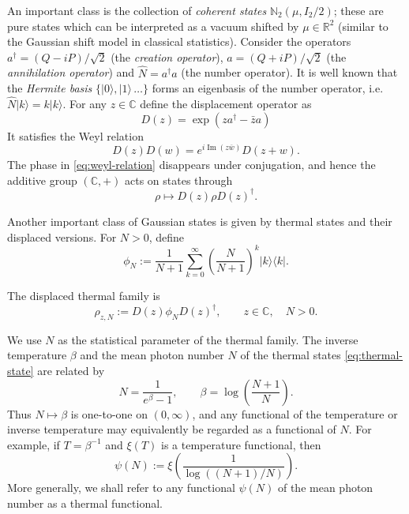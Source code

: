 \documentclass{article}
\theoremstyle{named}
\theoremstyle{named1}
\newcommand{\bbC}{\mathbb C}
\theoremstyle{plain}
\theoremstyle{remark}
\begin{document}
An important class
is the collection of \textit{coherent states} $\mathbb{N}_{2}\left(  \mu,I_2/2\right)  $;
these are pure states which can be interpreted as a vacuum shifted by $\mu
\in\mathbb{R}^{2}$ (similar to the Gaussian shift model in classical statistics).
Consider the operators $a^{\dagger}=(Q-iP)/\sqrt{2}$ (the \textit{creation operator}), $a=(Q+iP)/\sqrt{2}$ (the \textit{annihilation operator}) and $\hat N=a^{\dagger}a$ (the number operator). It is well known that the \textit{Hermite basis} $\{|0\rangle,|1\rangle\,\ldots\}$ forms an eigenbasis of the number operator,  i.e. $\hat N|k\rangle=k|k\rangle$. For any $z \in \mathbb{C}$ define the displacement operator as
$$D(z)=\exp(za^{\dagger}-\bar{z}a)$$ 
It satisfies the Weyl relation
\begin{equation}
    D(z)D(w)
    =
    e^{i\operatorname{Im}(z\overline w)}
    D(z+w).
    \label{eq:weyl-relation}
\end{equation}
The phase in \eqref{eq:weyl-relation} disappears under conjugation, and hence
the additive group
$(\bbC,+)$
acts on states through
\[
    \rho\longmapsto D(z)\rho D(z)^\dagger.
\]


Another important class of Gaussian states is given by thermal states and
their displaced versions. For $N>0$, define
\begin{equation}
    \phi_N
    :=
    \frac{1}{N+1}
    \sum_{k=0}^{\infty}
    \left(
        \frac{N}{N+1}
    \right)^k
    |k\rangle\langle k|.
    \label{eq:thermal-state}
\end{equation}


The displaced thermal family is
\begin{equation}
    \rho_{z,N}
    :=
    D(z)\phi_ND(z)^\dagger,
    \qquad
    z\in\bbC,\quad N>0.
    \label{eq:displaced-thermal}
\end{equation}

We use $N$ as the statistical parameter of the thermal family.  The inverse temperature $\beta$ and
the mean photon number $N$ of the thermal states \eqref{eq:thermal-state} are related by
\[
    N=\frac{1}{e^\beta-1},
    \qquad
    \beta=\log\!\left(\frac{N+1}{N}\right).
\]
Thus $N\mapsto\beta$ is one-to-one on $(0,\infty)$, and any functional
of the temperature or inverse temperature may equivalently be regarded
as a functional of $N$.  For example, if $T=\beta^{-1}$ and
$\xi(T)$ is a temperature functional, then
\[
    \psi(N)
    :=
    \xi\!\left(
        \frac{1}{\log((N+1)/N)}
    \right).
\]
More generally, we shall refer to any functional $\psi(N)$ of the mean
photon number as a thermal functional.
\end{document}
